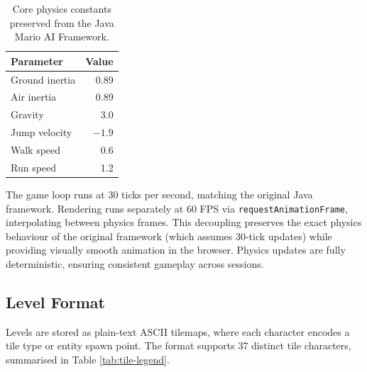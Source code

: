 \documentclass[shortabstract, mgr, english]{iithesis}
\begin{document}
\begin{table}[H]
\centering
\begin{tabular}{lr}
\toprule
\textbf{Parameter} & \textbf{Value} \\
\midrule
Ground inertia & 0.89 \\
Air inertia    & 0.89 \\
Gravity        & 3.0 \\
Jump velocity  & $-1.9$ \\
Walk speed     & 0.6 \\
Run speed      & 1.2 \\
\bottomrule
\end{tabular}
\caption{Core physics constants preserved from the Java Mario AI Framework.}
\label{tab:physics}
\end{table}

The game loop runs at 30 ticks per second, matching the original Java framework.
Rendering runs separately at 60 FPS via \texttt{requestAnimationFrame}, interpolating
between physics frames. This decoupling preserves the exact physics behaviour of the
original framework (which assumes 30-tick updates) while providing visually smooth
animation in the browser. Physics updates are fully deterministic, ensuring consistent
gameplay across sessions.

\subsection{Level Format}
\label{subsec:sd-level-format}

Levels are stored as plain-text ASCII tilemaps, where each character encodes a tile type
or entity spawn point. The format supports 37 distinct tile characters, summarised in
Table \ref{tab:tile-legend}.
\end{document}
